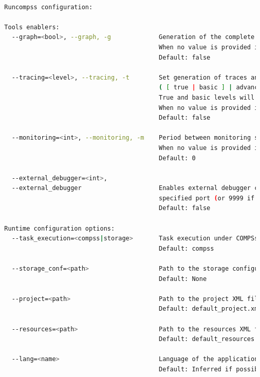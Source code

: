 \begin{lstlisting}[language=bash]
                                            
  Runcompss configuration:

  Tools enablers:
    --graph=<bool>, --graph, -g             Generation of the complete graph (true/false)
                                            When no value is provided it is set to true
                                            Default: false
                                            
    --tracing=<level>, --tracing, -t        Set generation of traces and/or tracing level 
                                            ( [ true | basic ] | advanced | false)
                                            True and basic levels will produce the same traces.
                                            When no value is provided it is set to true
                                            Default: false
                                            
    --monitoring=<int>, --monitoring, -m    Period between monitoring samples (milliseconds)
                                            When no value is provided it is set to 2000
                                            Default: 0
                                            
    --external_debugger=<int>,
    --external_debugger                     Enables external debugger connection on the 
                                            specified port (or 9999 if empty)
                                            Default: false

  Runtime configuration options:
    --task_execution=<compss|storage>       Task execution under COMPSs or Storage.
                                            Default: compss
                                            
    --storage_conf=<path>                   Path to the storage configuration file
                                            Default: None
                                            
    --project=<path>                        Path to the project XML file
                                            Default: default_project.xml
                                            
    --resources=<path>                      Path to the resources XML file
                                            Default: default_resources.xml
                                            
    --lang=<name>                           Language of the application (java/c/python)
                                            Default: Inferred if possible. Otherwise: java
                                            

\end{lstlisting}
